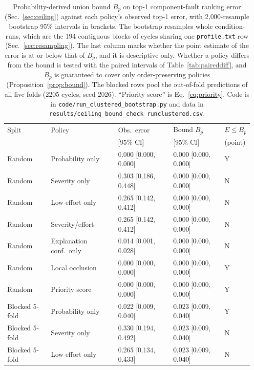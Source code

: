 \begin{table}[t]
\centering
\caption{Probability-derived union bound $B_p$ on top-1 component-fault ranking error (Sec.~\ref{sec:ceiling}) against each policy's observed top-1 error, with 2{,}000-resample bootstrap 95\% intervals in brackets. The bootstrap resamples whole condition-runs, which are the 194 contiguous blocks of cycles sharing one \texttt{profile.txt} row (Sec.~\ref{sec:resampling}). The last column marks whether the point estimate of the error is at or below that of $B_p$, and it is descriptive only. Whether a policy differs from the bound is tested with the paired intervals of Table~\ref{tab:paireddiff}, and $B_p$ is guaranteed to cover only order-preserving policies (Proposition~\ref{prop:bound}). The blocked rows pool the out-of-fold predictions of all five folds (2205 cycles, seed 2026). ``Priority score'' is Eq.~\eqref{eq:priority}. Code is in \texttt{code/run\_clustered\_bootstrap.py} and data in \texttt{results/ceiling\_bound\_check\_runclustered.csv}.}
\label{tab:ceilingbound}
\tiny
\setlength{\tabcolsep}{2pt}
\begin{tabular}{p{1.35cm}p{1.85cm}p{1.75cm}p{1.75cm}p{0.5cm}}
\hline
 Split & Policy & Obs.\ error & Bound $B_p$ & $E\le B_p$ \\
 & & [95\% CI] & [95\% CI] & (point) \\
\hline
Random & Probability only & 0.000 [0.000, 0.000] & 0.000 [0.000, 0.000] & Y \\
Random & Severity only & 0.303 [0.186, 0.448] & 0.000 [0.000, 0.000] & N \\
Random & Low effort only & 0.265 [0.142, 0.412] & 0.000 [0.000, 0.000] & N \\
Random & Severity/effort & 0.265 [0.142, 0.412] & 0.000 [0.000, 0.000] & N \\
Random & Explanation conf.\ only & 0.014 [0.001, 0.028] & 0.000 [0.000, 0.000] & N \\
Random & Local occlusion & 0.000 [0.000, 0.000] & 0.000 [0.000, 0.000] & Y \\
Random & Priority score & 0.000 [0.000, 0.000] & 0.000 [0.000, 0.000] & Y \\
\hline
Blocked 5-fold & Probability only & 0.022 [0.009, 0.040] & 0.023 [0.009, 0.040] & Y \\
Blocked 5-fold & Severity only & 0.330 [0.194, 0.492] & 0.023 [0.009, 0.040] & N \\
Blocked 5-fold & Low effort only & 0.265 [0.134, 0.433] & 0.023 [0.009, 0.040] & N \\

\end{tabular}
\end{table}
